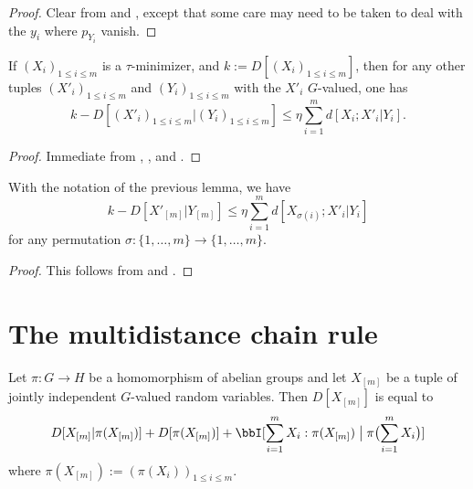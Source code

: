 \begin{proof}\leanok Clear from  and , except that some care may need to be taken to deal with the $y_i$ where $p_{Y_i}$ vanish.
\end{proof}


\begin{lemma}\label{cond-multidist-lower}\leanok  If  $(X_i)_{1 \leq i \leq m}$ is a $\tau$-minimizer, and $k := D[(X_i)_{1 \leq i \leq m}]$, then for any other tuples $(X'_i)_{1 \leq i \leq m}$ and $(Y_i)_{1 \leq i \leq m}$ with the $X'_i$ $G$-valued, one has
  $$ k - D[(X'_i)_{1 \leq i \leq m} | (Y_i)_{1 \leq i \leq m}] \leq \eta \sum_{i=1}^m d[X_i; X'_i|Y_i].$$
\end{lemma}

\begin{proof}\leanok
  Immediate from , , and .
\end{proof}

\begin{corollary}\label{cond-multidist-lower-II}\leanok With the notation of the previous lemma, we have
  \begin{equation}\label{5.3-conv}
    k - D[ X'_{[m]} | Y_{[m]} ] \leq \eta \sum_{i=1}^m d[X_{\sigma(i)};X'_i|Y_i]
  \end{equation}
for any permutation $\sigma : \{1,\dots,m\} \rightarrow \{1,\dots,m\}$.
\end{corollary}

\begin{proof}\leanok  This follows from  and .
\end{proof}

\section{The multidistance chain rule}

\begin{lemma}\label{multidist-chain-rule}\leanok  Let $\pi \colon G \to H$ be a homomorphism of abelian groups and let $X_{[m]}$ be a tuple of jointly independent $G$-valued random variables.  Then $D[X_{[m]}]$ is equal to
  \begin{equation}
      D[ X_{[m]} | \pi(X_{[m]}) ]  +D[ \pi(X_{[m]}) ]  + \bbI[ \sum_{i=1}^m X_i  : \pi(X_{[m]}) \; \big| \; \pi\bigl(\sum_{i=1}^m X_i\bigr) ]
    \label{chain-eq}
  \end{equation}
  where $\pi(X_{[m]}) := (\pi(X_i))_{1 \leq i \leq m}$.
  \end{lemma}

